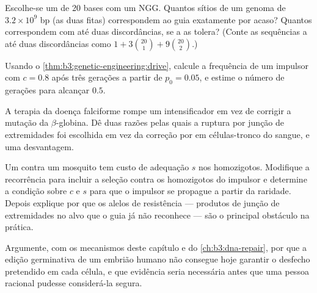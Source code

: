 \begin{exercise}[$\star\star$]\label{exo:b3:genetic-engineering:8}
Escolhe-se um  de 20 bases com um  NGG. Quantos sítios de um
genoma de $3.2\times 10^{9}$ bp (as duas fitas) correspondem ao guia
exatamente por acaso? Quantos correspondem com até duas discordâncias,
se a  as tolera? (Conte as sequências a até duas discordâncias como
$1 + 3\binom{20}{1} +
9\binom{20}{2}$.)
\end{exercise}

\begin{exercise}[$\star\star$]\label{exo:b3:genetic-engineering:9}
Usando o \cref{thm:b3:genetic-engineering:drive}, calcule a frequência
de um impulsor com $c = 0.8$ após três gerações a partir de
$p_{0} = 0.05$, e estime o número de gerações para alcançar $0.5$.
\end{exercise}

\begin{exercise}[$\star\star\star$]\label{exo:b3:genetic-engineering:10}
A terapia da doença falciforme rompe um intensificador em vez de
corrigir a mutação da $\beta$-globina. Dê duas razões pelas quais a
ruptura por junção de extremidades foi escolhida em vez da correção por
 em células-tronco do sangue, e uma desvantagem.
\end{exercise}

\begin{exercise}[$\star\star\star$]\label{exo:b3:genetic-engineering:11}
Um  contra um mosquito tem custo de adequação $s$ nos
homozigotos. Modifique a recorrência para incluir a seleção contra os
homozigotos do impulsor e determine a condição sobre $c$ e $s$ para que
o impulsor se propague a partir da raridade. Depois explique por que os
alelos de resistência --- produtos de junção de extremidades no alvo que
o guia já não reconhece --- são o principal obstáculo na prática.
\end{exercise}

\begin{exercise}[$\star\star\star$]\label{exo:b3:genetic-engineering:12}
Argumente, com os mecanismos deste capítulo e do
\cref{ch:b3:dna-repair}, por que a edição germinativa de um embrião
humano não consegue hoje garantir o desfecho pretendido em cada célula,
e que evidência seria necessária antes que uma pessoa racional pudesse
considerá-la segura.
\end{exercise}

